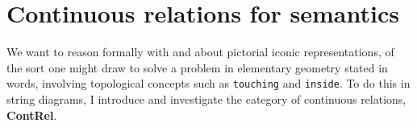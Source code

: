 



\maketitle%

\tableofcontents{}


\chapter{Continuous relations for semantics}\label{chapter:contrel}
We want to reason formally with and about pictorial iconic representations, of the sort one might draw to solve a problem in elementary geometry stated in words, involving topological concepts such as \texttt{touching} and \texttt{inside}. To do this in string diagrams, I introduce and investigate the category of continuous relations, \textbf{ContRel}.

\newpage
\clearpage
\clearmargin

\newpage
\clearpage
\clearmargin

\newpage
\clearpage
\clearmargin

\newpage
\clearpage
\clearmargin
\label{sec:topconcepts}
\newpage

\newpage






